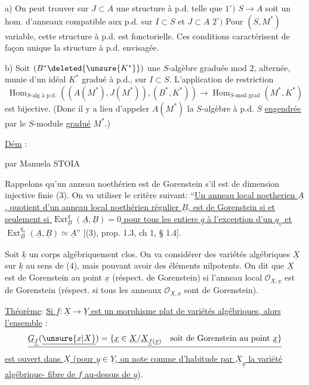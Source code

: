 a) On peut trouver sur  $J\subset A$ une structure à p.d. telle que $1^\circ)$ $S\longrightarrow A$ soit un hom. d'anneaux compatible aux p.d. sur $I\subset S$ et $J\subset A$ $2^\circ)$ Pour $(S,M^*)$ variable, cette structure à p.d. est fonctorielle. Ces conditions caractérisent de façon unique la structure à p.d. envisagée.

b) Soit $(B^*\deleted{\unsure{K^*}})$ une $S$-algèbre graduée mod $2$,  alternée, munie d'un idéal $K^*$ gradué à p.d.,   sur $I\subset S$.
L'application de restriction
\[
\operatorname{Hom}_{S\text{-alg à p.d.}}((A(M^*),J(M^*)),(B^*,K^*))
\longrightarrow\operatorname{Hom}_{S\text{-mod grad}}(M^*,K^*)
\]
est bijective. (Donc il y a lieu d'appeler $A(M^*)$ la $S$-algèbre  à p.d.  $S$ \uline{engendrée} par le $S$-module \uline{gradué} $M^*$.)

\uline{Dém} :

\begin{center}

par Manuela STOIA
\end{center}

Rappelons qu'un anneau noethérien est de Gorenstein s'il est de dimension injective finie (3). On va utiliser le critère suivant: ``\uline{Un anneau local noetherien $\underline A$, quotient d'un anneau local noethérien régulier $\underline B$, est de Gorenstein si et seulement si $\operatorname{Ext}^{q}_{\underline B}(\underline A,\underline B)=0$ pour tous les entiers $\underline q$ à l'exception d'un $q_{\underline o}$ et $\operatorname{Ext}^{q_o}_{\underline B}(\underline A,\underline B)\simeq\underline A$}'' [(3), prop. 1.3, ch 1, § 1.4].

Soit $\underline k$ un corps algébriquement clos. On va considérer des variétés algébriques $\underline X$ sur $\underline k$ au sens de (4), mais pouvant avoir des éléments nilpotents. On dit que $\underline X$ est de Gorenstein au point $\underline x$ (réspect. de Gorenstein) si l'anneau local $\mathcal O_{\underline X,\underline x}$ est de Gorenstein (réspect. si tous les anneaux $\mathcal O_{\underline X,\underline x}$ sont de Gorenstein).

\uline{Théorème}: \uline{Si $\underline f:\underline X\longrightarrow\underline Y$ est un morphisme plat de variétés algébriques, alors l'ensemble} :
\[
\underline{\underline G_{\underline f}(\underline{\unsure{x|X}})=\{\underline x\in\underline X/\underline X_{\underline f(\underline x)}\quad\text{soit de Gorenstein au point }\underline x\}}
\]
\uline{est ouvert dans $\underline X$ (pour $\underline y\in\underline Y$, on note comme d'habitude par $\underline X_{\underline y}$ la variété algébrique- fibre de $\underline f$ au-dessus de $\underline y$)}.

